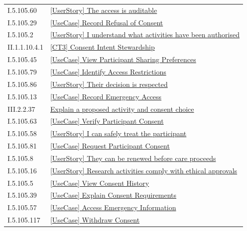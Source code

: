 \begin{longtable}{p{.22\linewidth}p{.73\linewidth}}
I.5.105.60 & \hyperref[element:d461af9419584ea5a965f2c1c9cf1e9f]{[UserStory] The access is auditable} \\
I.5.105.29 & \hyperref[element:d5dc88511123400d98ad01802a46c12a]{[UseCase] Record Refusal of Consent} \\
I.5.105.2 & \hyperref[element:d64590003f144adebad409dd9e369ecf]{[UserStory] I understand what activities have been authorised} \\
II.1.1.10.4.1 & \hyperref[element:d65ed66aba2542da87a321e7eeb274b9]{[CT3] Consent Intent Stewardship} \\
I.5.105.45 & \hyperref[element:d6f683e5f75e42d98b71c7817cf5d987]{[UseCase] View Participant Sharing Preferences} \\
I.5.105.79 & \hyperref[element:d728cfc6007b4f4698a481842ec5d361]{[UseCase] Identify Access Restrictions} \\
I.5.105.86 & \hyperref[element:dc0b73c2c0c445739db4c2a85ff4c8a8]{[UserStory] Their decision is respected} \\
I.5.105.13 & \hyperref[element:dc7e969960e44a3283004495908b8bc4]{[UseCase] Record Emergency Access} \\
III.2.2.37 & \hyperref[element:ddc83b3ab1e646d5bf86578001959480]{Explain a proposed activity and consent choice} \\
I.5.105.63 & \hyperref[element:de44d4dbe2d34bc2ba8878f5cdb8aeb6]{[UseCase] Verify Participant Consent} \\
I.5.105.58 & \hyperref[element:e0b3b896e9b94afb817eec9dd157c5b8]{[UserStory] I can safely treat the participant} \\
I.5.105.81 & \hyperref[element:e21864f1c6e14404b57eee52fe2a33a8]{[UseCase] Request Participant Consent} \\
I.5.105.8 & \hyperref[element:e5c040d3ede84ac6b7f8a5bd49f18001]{[UserStory] They can be renewed before care proceeds} \\
I.5.105.16 & \hyperref[element:e75ae2803cc14c548b964886ad3f582e]{[UserStory] Research activities comply with ethical approvals} \\
I.5.105.5 & \hyperref[element:e7d94e7f56f1406b946b0c7e10df95ac]{[UseCase] View Consent History} \\
I.5.105.39 & \hyperref[element:e9314966450b4daf91b807e8e55f9292]{[UseCase] Explain Consent Requirements} \\
I.5.105.57 & \hyperref[element:ea841605801a4fab93de4152598c4759]{[UseCase] Access Emergency Information} \\
I.5.105.117 & \hyperref[element:eb3c2ebecdb04191907ab48b96cb0265]{[UseCase] Withdraw Consent} \\

\end{longtable}
